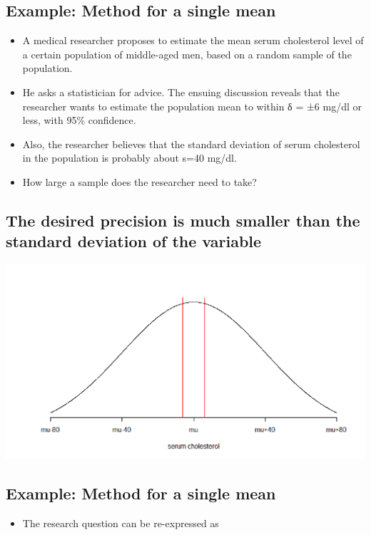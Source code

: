 \documentclass[
]{book}
\providecommand{\tightlist}{%
  \setlength{\itemsep}{0pt}\setlength{\parskip}{0pt}}
\begin{document}
\hypertarget{example-method-for-a-single-mean}{%
\subsection{Example: Method for a single mean}\label{example-method-for-a-single-mean}}

\begin{itemize}
\tightlist
\item
  A medical researcher proposes to estimate the mean serum cholesterol level of a certain population of middle-aged men, based on a random sample of the population.
\item
  He asks a statistician for advice. The ensuing discussion reveals that the researcher wants to estimate the population mean to within δ = ±6 mg/dl or less, with 95\% confidence.
\item
  Also, the researcher believes that the standard deviation of serum cholesterol in the population is probably about s=40 mg/dl.
\item
  How large a sample does the researcher need to take?
\end{itemize}

\hypertarget{the-desired-precision-is-much-smaller-than-the-standard-deviation-of-the-variable}{%
\subsection{The desired precision is much smaller than the standard deviation of the variable}\label{the-desired-precision-is-much-smaller-than-the-standard-deviation-of-the-variable}}

\includegraphics[width=0.5\linewidth]{./3_70}

\hypertarget{example-method-for-a-single-mean-1}{%
\subsection{Example: Method for a single mean}\label{example-method-for-a-single-mean-1}}

\begin{itemize}
\tightlist
\item
  The research question can be re-expressed as
\end{itemize}
\end{document}
